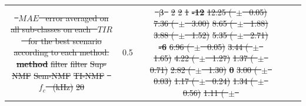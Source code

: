 \documentclass[twocolumn]{svjour3}          %
\providecommand{\DIFaddtex}[1]{{\protect\color{blue}\uwave{#1}}} %
\providecommand{\DIFdeltex}[1]{{\protect\color{red}\sout{#1}}}                      %
\providecommand{\DIFaddFL}[1]{\DIFadd{#1}} %
\providecommand{\DIFdelFL}[1]{\DIFdel{#1}} %
\providecommand{\DIFaddbeginFL}{} %
\providecommand{\DIFaddendFL}{} %
\providecommand{\DIFdelbeginFL}{} %
\providecommand{\DIFdelendFL}{} %
\providecommand{\DIFadd}[1]{\texorpdfstring{\DIFaddtex{#1}}{#1}} %
\providecommand{\DIFdel}[1]{\texorpdfstring{\DIFdeltex{#1}}{}} %
\begin{document}
\begin{table}[t]
\begin{tabular}{@{}ccccccc@{}}
{%
\DIFdelFL{\mbox{%
$MAE$
}%
error averaged on all sub-classes on each \mbox{%
$TIR$
}%
for the best scenario according to each method.}}
\textbf{\DIFdelFL{method}} %
\DIFdelFL{filter }%
\DIFdelFL{filter }%
\DIFdelFL{Sup-NMF }%
\DIFdelFL{Sem-NMF }%
\DIFdelFL{TI-NMF }%
\DIFdelFL{\mbox{%
$f_c$
}%
(kHz) }%
\DIFdelFL{20 }\DIFdelendFL \DIFaddbeginFL \DIFaddFL{200 }\DIFaddendFL & 0.5 &  \DIFaddbeginFL \DIFaddFL{0.36 }\DIFaddendFL & \DIFdelbeginFL %
\DIFdelFL{\mbox{%
$\mathbf{\beta}$
}%
}%
\DIFdelFL{2 }%
\DIFdelFL{2 }%
\DIFdelFL{1 }%
\textbf{\DIFdelFL{-12}} %
\DIFdelFL{12.25 (\mbox{%
$\pm$
}%
0.05) }%
\DIFdelFL{7.36 (\mbox{%
$\pm$
}%
3.00) }%
\DIFdelFL{8.65 (\mbox{%
$\pm$
}%
1.88) }%
\DIFdelFL{3.88 (\mbox{%
$\pm$
}%
1.52) }%
\DIFdelFL{5.35 (\mbox{%
$\pm$
}%
2.71) }%
\textbf{\DIFdelFL{-6}} %
\DIFdelFL{6.96 (\mbox{%
$\pm$
}%
0.05) }%
\DIFdelFL{3.44 (\mbox{%
$\pm$
}%
1.65) }%
\DIFdelFL{4.22 (\mbox{%
$\pm$
}%
1.27) }%
\DIFdelFL{1.37 (\mbox{%
$\pm$
}%
0.71)  }%
\DIFdelFL{2.82 (\mbox{%
$\pm$
}%
1.30) }%
\textbf{\DIFdelFL{0}} %
\DIFdelFL{3.00 (\mbox{%
$\pm$
}%
0.03) }%
\DIFdelFL{1.17 (\mbox{%
$\pm$
}%
0.24) }%
\DIFdelFL{1.34 (\mbox{%
$\pm$
}%
0.56) }%
\DIFdelFL{1.11 (\mbox{%
$\pm$
}%
}
\end{tabular}
\end{table}
\end{document}
